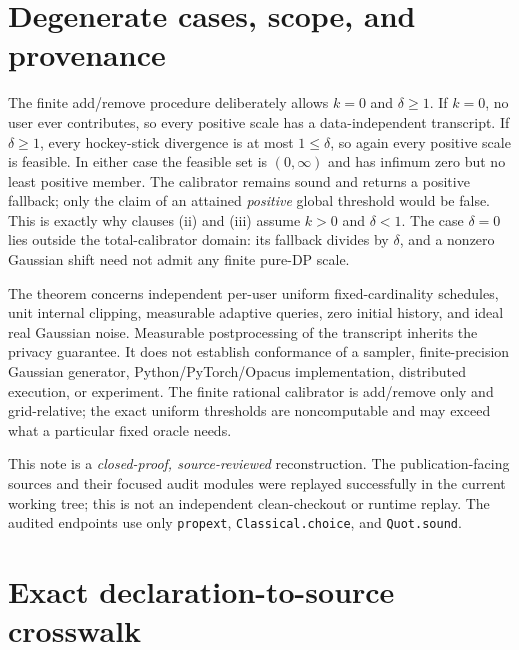 \documentclass[11pt]{article}
\theoremstyle{remark}
\begin{document}
\section{Degenerate cases, scope, and provenance}

The finite add/remove procedure deliberately allows $k=0$ and
$\delta\geq1$.  If $k=0$, no user ever contributes, so every positive scale
has a data-independent transcript.  If $\delta\geq1$, every hockey-stick
divergence is at most $1\leq\delta$, so again every positive scale is feasible.
In either case the feasible set is $(0,\infty)$ and has infimum zero but no
least positive member.  The calibrator remains sound and returns a positive
fallback; only the claim of an attained \emph{positive} global threshold
would be false.  This is exactly why clauses (ii) and (iii) assume
$k>0$ and $\delta<1$.  The case $\delta=0$ lies outside the total-calibrator
domain: its fallback divides by $\delta$, and a nonzero Gaussian shift need
not admit any finite pure-DP scale.

The theorem concerns independent per-user uniform fixed-cardinality
schedules, unit internal clipping, measurable adaptive queries, zero initial
history, and ideal real Gaussian noise.  Measurable postprocessing of the
transcript inherits the privacy guarantee.  It does not establish conformance
of a sampler, finite-precision Gaussian generator, Python/PyTorch/Opacus
implementation, distributed execution, or experiment.  The finite rational
calibrator is add/remove only and grid-relative; the exact uniform thresholds
are noncomputable and may exceed what a particular fixed oracle needs.

This note is a \emph{closed-proof, source-reviewed} reconstruction.  The
publication-facing sources and their focused audit modules were replayed
successfully in the current working tree; this is not an independent
clean-checkout or runtime replay.  The audited endpoints use only
\texttt{propext}, \texttt{Classical.choice}, and \texttt{Quot.sound}.

\appendix
\section{Exact declaration-to-source crosswalk}

\begingroup
\scriptsize
\setlength{\parindent}{0pt}
\setlength{\parskip}{0.35em}
\end{document}
